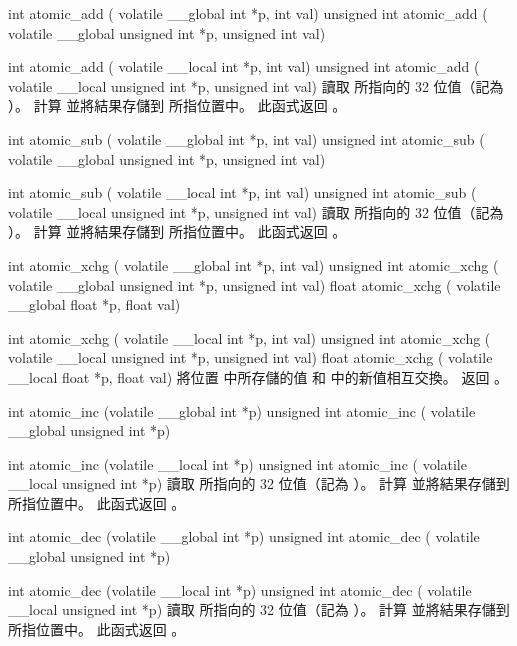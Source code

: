 int atomic_add (
	volatile __global int *p,
	int val)
unsigned int atomic_add (
	volatile __global unsigned int *p,
	unsigned int val)

int atomic_add (
	volatile __local int *p,
	int val)
unsigned int atomic_add (
	volatile __local unsigned int *p,
	unsigned int val)
\stopbuffer
{}
讀取  所指向的 32 位值（記為 ）。
計算  並將結果存儲到  所指位置中。
此函式返回 。
\stopbuffer

int atomic_sub (
	volatile __global int *p,
	int val)
unsigned int atomic_sub (
	volatile __global unsigned int *p,
	unsigned int val)

int atomic_sub (
	volatile __local int *p,
	int val)
unsigned int atomic_sub (
	volatile __local unsigned int *p,
	unsigned int val)
\stopbuffer
{}
讀取  所指向的 32 位值（記為 ）。
計算  並將結果存儲到  所指位置中。
此函式返回 。
\stopbuffer

int atomic_xchg (
	volatile __global int *p,
	int val)
unsigned int atomic_xchg (
	volatile __global unsigned int *p,
	unsigned int val)
float atomic_xchg (
	volatile __global float *p,
	float val)

int atomic_xchg (
	volatile __local int *p,
	int val)
unsigned int atomic_xchg (
	volatile __local unsigned int *p,
	unsigned int val)
float atomic_xchg (
	volatile __local float *p,
	float val)
\stopbuffer
{}
將位置  中所存儲的值  和  中的新值相互交換。
返回 。
\stopbuffer

int atomic_inc (volatile __global int *p)
unsigned int atomic_inc (
	volatile __global unsigned int *p)

int atomic_inc (volatile __local int *p)
unsigned int atomic_inc (
	volatile __local unsigned int *p)
\stopbuffer
{}
讀取  所指向的 32 位值（記為 ）。
計算  並將結果存儲到  所指位置中。
此函式返回 。
\stopbuffer

int atomic_dec (volatile __global int *p)
unsigned int atomic_dec (
	volatile __global unsigned int *p)

int atomic_dec (volatile __local int *p)
unsigned int atomic_dec (
	volatile __local unsigned int *p)
\stopbuffer
{}
讀取  所指向的 32 位值（記為 ）。
計算  並將結果存儲到  所指位置中。
此函式返回 。
\stopbuffer

